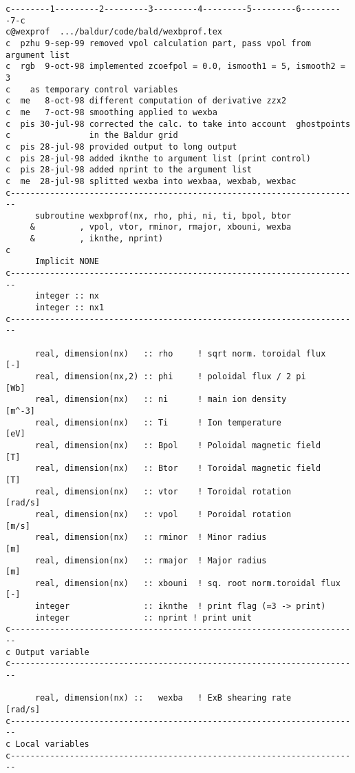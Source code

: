 \begin{verbatim}
c--------1---------2---------3---------4---------5---------6---------7-c
c@wexprof  .../baldur/code/bald/wexbprof.tex
c  pzhu 9-sep-99 removed vpol calculation part, pass vpol from argument list
c  rgb  9-oct-98 implemented zcoefpol = 0.0, ismooth1 = 5, ismooth2 = 3
c    as temporary control variables
c  me   8-oct-98 different computation of derivative zzx2
c  me   7-oct-98 smoothing applied to wexba  
c  pis 30-jul-98 corrected the calc. to take into account  ghostpoints 
c                in the Baldur grid
c  pis 28-jul-98 provided output to long output
c  pis 28-jul-98 added iknthe to argument list (print control) 
c  pis 28-jul-98 added nprint to the argument list
c  me  28-jul-98 splitted wexba into wexbaa, wexbab, wexbac  
c-----------------------------------------------------------------------
      subroutine wexbprof(nx, rho, phi, ni, ti, bpol, btor
     &         , vpol, vtor, rminor, rmajor, xbouni, wexba
     &         , iknthe, nprint)
c
      Implicit NONE
c-----------------------------------------------------------------------
      integer :: nx
      integer :: nx1
c-----------------------------------------------------------------------

      real, dimension(nx)   :: rho     ! sqrt norm. toroidal flux    [-]
      real, dimension(nx,2) :: phi     ! poloidal flux / 2 pi       [Wb]
      real, dimension(nx)   :: ni      ! main ion density         [m^-3]    
      real, dimension(nx)   :: Ti      ! Ion temperature            [eV]       
      real, dimension(nx)   :: Bpol    ! Poloidal magnetic field     [T]
      real, dimension(nx)   :: Btor    ! Toroidal magnetic field     [T]
      real, dimension(nx)   :: vtor    ! Toroidal rotation       [rad/s]
      real, dimension(nx)   :: vpol    ! Poroidal rotation         [m/s]
      real, dimension(nx)   :: rminor  ! Minor radius                [m]
      real, dimension(nx)   :: rmajor  ! Major radius                [m]
      real, dimension(nx)   :: xbouni  ! sq. root norm.toroidal flux [-]
      integer               :: iknthe  ! print flag (=3 -> print)
      integer               :: nprint ! print unit
c-----------------------------------------------------------------------
c Output variable
c-----------------------------------------------------------------------

      real, dimension(nx) ::   wexba   ! ExB shearing rate       [rad/s]
c-----------------------------------------------------------------------     
c Local variables
c-----------------------------------------------------------------------


\end{verbatim}
